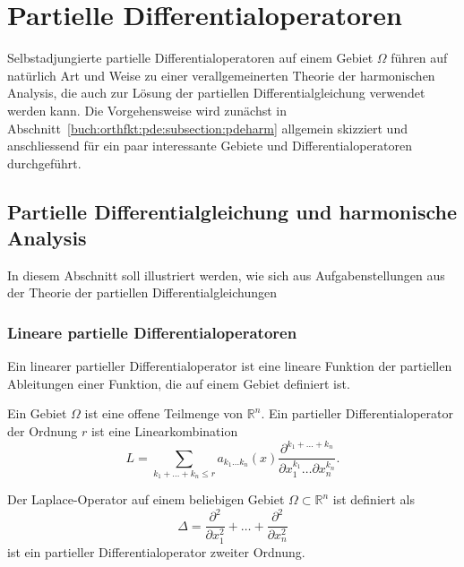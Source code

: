 %
%
%
\section{Partielle Differentialoperatoren
\label{buch:orthofkt:section:pde}}
Selbstadjungierte partielle Differentialoperatoren auf einem Gebiet 
$\Omega$ führen auf natürlich Art und Weise zu einer verallgemeinerten
Theorie der harmonischen Analysis, die auch zur Lösung der
partiellen Differentialgleichung verwendet werden kann.
Die Vorgehensweise wird zunächst in
Abschnitt~\ref{buch:orthfkt:pde:subsection:pdeharm}
allgemein skizziert und anschliessend für ein paar interessante
Gebiete und Differentialoperatoren durchgeführt.

%
%
\subsection{Partielle Differentialgleichung und harmonische Analysis
\label{buch:orthfkt:pde:subsection:pdeharm}}
In diesem Abschnitt soll illustriert werden, wie sich aus Aufgabenstellungen
aus der Theorie der partiellen Differentialgleichungen 

%
%
\subsubsection{Lineare partielle Differentialoperatoren}
Ein linearer partieller Differentialoperator ist eine lineare
Funktion der partiellen Ableitungen einer Funktion, die auf einem
Gebiet definiert ist.

\begin{definition}
Ein Gebiet $\Omega$ ist eine offene Teilmenge von $\mathbb{R}^n$.
Ein partieller Differentialoperator der Ordnung $r$ ist eine Linearkombination
\[
L
=
\sum_{k_1+\dots+k_n\le r}
a_{k_1\dots k_n}(x)
\frac{\partial^{k_1+\dots+k_n}}{\partial x_1^{k_1}\dots\partial x_n^{k_n}}.
\]
\end{definition}

\begin{beispiel}
Der Laplace-Operator auf einem beliebigen Gebiet $\Omega\subset\mathbb{R}^n$
ist definiert als
\[
\Delta
=
\frac{\partial^2}{\partial x_1^2}
+
\dots
+
\frac{\partial^2}{\partial x_n^2}
\]
ist ein partieller Differentialoperator zweiter Ordnung.
\end{beispiel}

